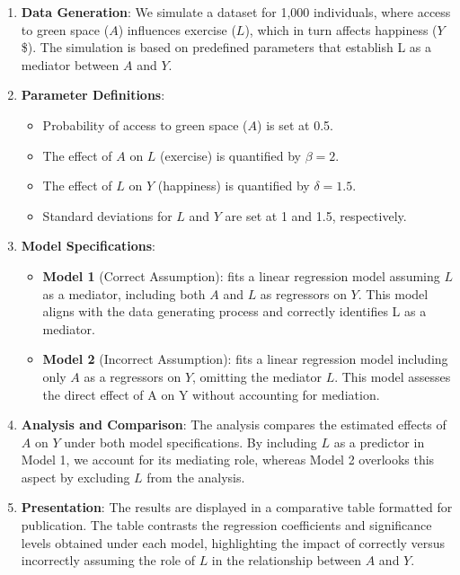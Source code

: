 \documentclass[
  singlecolumn]{article}
\providecommand{\tightlist}{%
  \setlength{\itemsep}{0pt}\setlength{\parskip}{0pt}}\usepackage{longtable,booktabs,array}
\begin{document}
\begin{enumerate}
\def\labelenumi{\arabic{enumi}.}
\item
  \textbf{Data Generation}: We simulate a dataset for 1,000 individuals,
  where access to green space (\(A\)) influences exercise (\(L\)), which
  in turn affects happiness (\(Y\)\$). The simulation is based on
  predefined parameters that establish L as a mediator between \(A\) and
  \(Y\).
\item
  \textbf{Parameter Definitions}:

  \begin{itemize}
  \tightlist
  \item
    Probability of access to green space (\(A\)) is set at 0.5.
  \item
    The effect of \(A\) on \(L\) (exercise) is quantified by
    \(\beta = 2\).
  \item
    The effect of \(L\) on \(Y\) (happiness) is quantified by
    \(\delta = 1.5\).
  \item
    Standard deviations for \(L\) and \(Y\) are set at 1 and 1.5,
    respectively.
  \end{itemize}
\item
  \textbf{Model Specifications}:

  \begin{itemize}
  \tightlist
  \item
    \textbf{Model 1} (Correct Assumption): fits a linear regression
    model assuming \(L\) as a mediator, including both \(A\) and \(L\)
    as regressors on \(Y\). This model aligns with the data generating
    process and correctly identifies L as a mediator.
  \item
    \textbf{Model 2} (Incorrect Assumption): fits a linear regression
    model including only \(A\) as a regressors on \(Y\), omitting the
    mediator \(L\). This model assesses the direct effect of A on Y
    without accounting for mediation.
  \end{itemize}
\item
  \textbf{Analysis and Comparison}: The analysis compares the estimated
  effects of \(A\) on \(Y\) under both model specifications. By
  including \(L\) as a predictor in Model 1, we account for its
  mediating role, whereas Model 2 overlooks this aspect by excluding
  \(L\) from the analysis.
\item
  \textbf{Presentation}: The results are displayed in a comparative
  table formatted for publication. The table contrasts the regression
  coefficients and significance levels obtained under each model,
  highlighting the impact of correctly versus incorrectly assuming the
  role of \(L\) in the relationship between \(A\) and \(Y\).
\end{enumerate}
\end{document}
